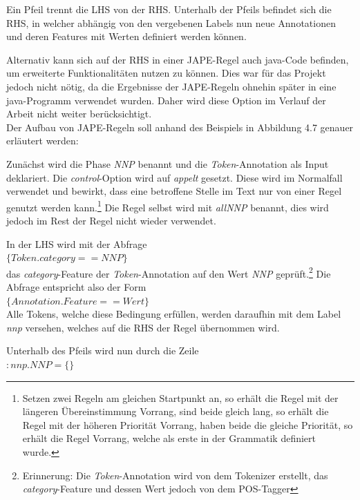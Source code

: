 \documentclass[12pt]{report}
\begin{document}
Ein Pfeil trennt die LHS von der RHS. Unterhalb der Pfeils befindet sich die RHS, in welcher abhängig von den vergebenen Labels nun neue Annotationen und deren Features mit Werten definiert werden können. 

Alternativ kann sich auf der RHS in einer JAPE-Regel auch java-Code befinden, um erweiterte Funktionalitäten nutzen zu können. Dies war für das Projekt jedoch nicht nötig, da die Ergebnisse der JAPE-Regeln ohnehin später in eine java-Programm verwendet wurden. Daher wird diese Option im Verlauf der Arbeit nicht weiter berücksichtigt. \\ 

Der Aufbau von JAPE-Regeln soll anhand des Beispiels in Abbildung 4.7 genauer erläutert werden:

Zunächst wird die Phase \textit{NNP} benannt und die \textit{Token}-Annotation als Input deklariert. Die \textit{control}-Option wird auf \textit{appelt} gesetzt. Diese wird im Normalfall verwendet und bewirkt, dass eine betroffene Stelle im Text nur von einer Regel genutzt werden kann.\footnote{Setzen zwei Regeln am gleichen Startpunkt an, so erhält die Regel mit der längeren Übereinstimmung Vorrang, sind beide gleich lang, so erhält die Regel mit der höheren Priorität Vorrang, haben beide die gleiche Priorität, so erhält die Regel Vorrang, welche als erste in der Grammatik definiert wurde.\cite{tol09}} Die Regel selbst wird mit \textit{allNNP} benannt, dies wird jedoch im Rest der Regel nicht wieder verwendet. 

In der LHS wird mit der Abfrage\\

$\{Token.category==NNP\}$\\

das \textit{category}-Feature der \textit{Token}-Annotation auf den Wert \textit{NNP} geprüft.\footnote{Erinnerung: Die \textit{Token}-Annotation wird von dem Tokenizer erstellt, das \textit{category}-Feature und dessen Wert jedoch von dem POS-Tagger} Die Abfrage entspricht also der Form\\

$\{Annotation.Feature==Wert\}$\\

Alle Tokens, welche diese Bedingung erfüllen, werden daraufhin mit dem Label \textit{nnp} versehen, welches auf die RHS der Regel übernommen wird. 

Unterhalb des Pfeils wird nun durch die Zeile\\

$:nnp.NNP=\{\}$\\
\end{document}
